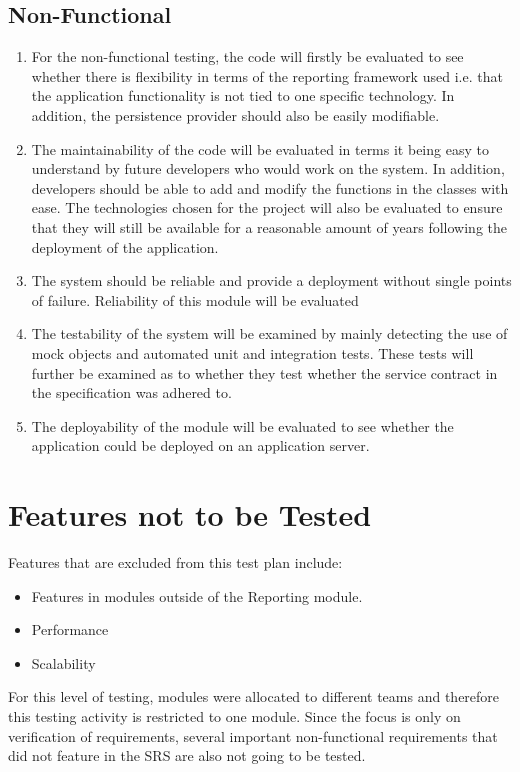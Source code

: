 \subsection{Non-Functional}
\begin{enumerate}
\item For the non-functional testing, the code will firstly be evaluated to see whether there is flexibility in terms of the reporting framework used i.e. that the application functionality is not tied to one specific technology. In addition, the persistence provider should also be easily modifiable. 
\item The maintainability of the code will be evaluated in terms it being easy to understand by future developers who would work on the system. In addition, developers should be able to add and modify the functions in the classes with ease. The technologies chosen for the project will also be evaluated to ensure that they will still be available for a reasonable amount of years following the deployment of the application.
\item The system should be reliable and provide a deployment without single points of failure. Reliability of this module will be evaluated 
\item The testability of the system will be examined by mainly detecting the use of mock objects and automated unit and integration tests. These tests will further be examined as to whether they test whether the service contract in the specification was adhered to.
\item The deployability of the module will be evaluated to see whether the application could be deployed on an application server.
\end{enumerate}

\section{Features not to be Tested}
Features that are excluded from this test plan include:
\begin{itemize}
	\item Features in modules outside of the Reporting module.
	\item Performance
	\item Scalability
\end{itemize}

For this level of testing, modules were allocated to different teams and therefore this testing activity is restricted to one module. Since the focus is only on verification of requirements, several important non-functional requirements that did not feature in the SRS are also not going to be tested.

